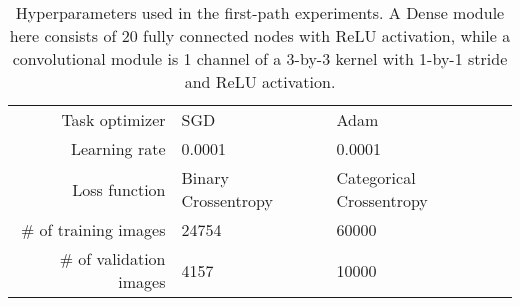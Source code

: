 \begin{table}[ht]
\begin{tabular}{rll}
Task optimizer         & SGD                                                                                          & Adam                                                                                                                                                              \\
Learning rate          & 0.0001                                                                                       & 0.0001                                                                                                                                                            \\
Loss function          & Binary Crossentropy                                                                          & Categorical Crossentropy                                                                                                                                          \\
\# of training images   & 24754                                                                                        & 60000                                                                                                                                          \\
\# of validation images & 4157                                                                                         & 10000    

\end{tabular}
\caption[Hyperparameters for Selection vs Search experiment]{Hyperparameters used in the first-path experiments. A Dense module here consists of 20 fully connected nodes with ReLU activation, while a convolutional module is 1 channel of a 3-by-3 kernel with 1-by-1 stride and ReLU activation.}
\label{tab:exp1.hyperparam}
\end{table}